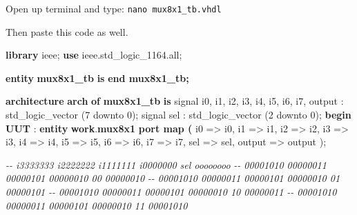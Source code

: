 \documentclass[11pt]{article}
\newenvironment{Shaded}{}{}
\newcommand{\KeywordTok}[1]{\textcolor[rgb]{0.00,0.44,0.13}{\textbf{{#1}}}}
\newcommand{\DataTypeTok}[1]{\textcolor[rgb]{0.56,0.13,0.00}{{#1}}}
\newcommand{\DecValTok}[1]{\textcolor[rgb]{0.25,0.63,0.44}{{#1}}}
\newcommand{\CommentTok}[1]{\textcolor[rgb]{0.38,0.63,0.69}{\textit{{#1}}}}
\newcommand{\OtherTok}[1]{\textcolor[rgb]{0.00,0.44,0.13}{{#1}}}
\newcommand{\ErrorTok}[1]{\textcolor[rgb]{1.00,0.00,0.00}{\textbf{{#1}}}}
\newcommand{\NormalTok}[1]{{#1}}
\begin{document}
Open up terminal and type: \texttt{nano\ mux8x1\_tb.vhdl}

Then paste this code as well.

\begin{Shaded}
\begin{Highlighting}[]
\KeywordTok{library}\NormalTok{ ieee;}
\KeywordTok{use}\NormalTok{ ieee}\OtherTok{.}\NormalTok{std\_logic\_1164}\OtherTok{.}\NormalTok{all;}

\KeywordTok{entity} \KeywordTok{mux8x1\_tb} \KeywordTok{is}
\KeywordTok{end mux8x1\_tb;}

\KeywordTok{architecture} \KeywordTok{arch} \KeywordTok{of} \KeywordTok{mux8x1\_tb} \KeywordTok{is}
    \OtherTok{signal}\NormalTok{ i0}\OtherTok{,}\NormalTok{ i1}\OtherTok{,}\NormalTok{ i2}\OtherTok{,}\NormalTok{ i3}\OtherTok{,}\NormalTok{ i4}\OtherTok{,}\NormalTok{ i5}\OtherTok{,}\NormalTok{ i6}\OtherTok{,}\NormalTok{ i7}\OtherTok{,}\NormalTok{ output }\OtherTok{:} \DataTypeTok{std\_logic\_vector}\NormalTok{ (}\DecValTok{7} \OtherTok{downto} \DecValTok{0}\NormalTok{);}
    \OtherTok{signal}\NormalTok{ sel }\OtherTok{:} \DataTypeTok{std\_logic\_vector}\NormalTok{ (}\DecValTok{2} \OtherTok{downto} \DecValTok{0}\NormalTok{);}
\KeywordTok{begin}
    \KeywordTok{UUT} \OtherTok{:} \ErrorTok{entity} \ErrorTok{work}\OtherTok{.}\ErrorTok{mux8x1} \KeywordTok{port map (}
\NormalTok{        i0 }\OtherTok{=\textgreater{}}\NormalTok{ i0}\OtherTok{,}
\NormalTok{        i1 }\OtherTok{=\textgreater{}}\NormalTok{ i1}\OtherTok{,}
\NormalTok{        i2 }\OtherTok{=\textgreater{}}\NormalTok{ i2}\OtherTok{,}
\NormalTok{        i3 }\OtherTok{=\textgreater{}}\NormalTok{ i3}\OtherTok{,}
\NormalTok{        i4 }\OtherTok{=\textgreater{}}\NormalTok{ i4}\OtherTok{,}
\NormalTok{        i5 }\OtherTok{=\textgreater{}}\NormalTok{ i5}\OtherTok{,}
\NormalTok{        i6 }\OtherTok{=\textgreater{}}\NormalTok{ i6}\OtherTok{,}
\NormalTok{        i7 }\OtherTok{=\textgreater{}}\NormalTok{ i7}\OtherTok{,}
\NormalTok{        sel }\OtherTok{=\textgreater{}}\NormalTok{ sel}\OtherTok{,}
\NormalTok{        output }\OtherTok{=\textgreater{}}\NormalTok{ output}
\NormalTok{    );}


    \CommentTok{{-}{-} i3333333 i2222222 i1111111 i0000000 sel   oooooooo}
    \CommentTok{{-}{-} 00001010 00000011 00000101 00000010 00    00000010}
    \CommentTok{{-}{-} 00001010 00000011 00000101 00000010 01    00000101}
    \CommentTok{{-}{-} 00001010 00000011 00000101 00000010 10    00000011}
    \CommentTok{{-}{-} 00001010 00000011 00000101 00000010 11    00001010}


\end{Highlighting}
\end{Shaded}
\end{document}
